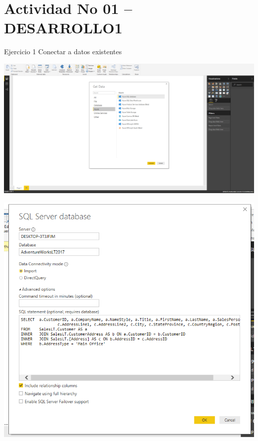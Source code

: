  \section{Actividad No 01 – DESARROLLO1} 
Ejercicio 1  Conectar a datos existentes \\
	\begin{center}
	\includegraphics[width=15cm]{./Imagenes/EJER1T1(1)}
	\end{center}	

	\begin{center}
	\includegraphics[width=15cm]{./Imagenes/EJER1T1(2)}
	\end{center}	

